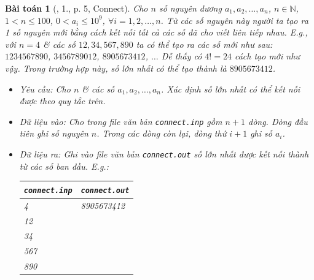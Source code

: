 \documentclass{article}
\newtheorem{baitoan}{Bài toán}
\begin{document}
\begin{baitoan}[\cite{Olympic30-4_2010_Tin_Hoc}, 1., p. 5, Connect]
	Cho $n$ số nguyên dương $a_1,a_2,\ldots,a_n$, $n\in\mathbb{N}$, $1 < n\le100$, $0 < a_i\le10^9$, $\forall i = 1,2,\ldots,n$. Từ các số nguyên này người ta tạo ra 1 số nguyên mới bằng cách kết nối tất cả các số đã cho viết liên tiếp nhau. E.g., với $n = 4$ \& các số $12,34,567,890$ ta có thể tạo ra các số mới như sau: $1234567890$, $3456789012$, $8905673412$, $\ldots$ Dễ thấy có $4! = 24$ cách tạo mới như vậy. Trong trường hợp này, số lớn nhất có thể tạo thành là $8905673412$.
	\begin{itemize}
		\item {\sf Yêu cầu:} Cho $n$ \& các số $a_1,a_2,\ldots,a_n$. Xác định số lớn nhất có thể kết nối được theo quy tắc trên.
		\item {\sf Dữ liệu vào:} Cho trong file văn bản \verb|connect.inp| gồm $n + 1$ dòng. Dòng đầu tiên ghi số nguyên $n$. Trong các dòng còn lại, dòng thứ $i + 1$ ghi số $a_i$.
		\item \emph{Dữ liệu ra:} Ghi vào file văn bản \verb|connect.out| số lớn nhất được kết nối thành từ các số ban đầu. E.g.:
		\begin{table}[H]
			\centering
			\begin{tabular}{|l|l|}
				\hline
				{\tt connect.inp} & {\tt connect.out} \\
				\hline
				4 & 8905673412 \\
				12 &  \\
				34 &  \\
				567 &  \\
				890 &  \\
				\hline
			\end{tabular}
		\end{table}
	\end{itemize}
\end{baitoan}
\end{document}
